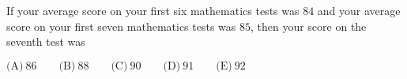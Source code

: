 

If your average score on your first six mathematics tests was $84$ and your average score on your first seven mathematics tests was $85$, then your score on the seventh test was

$\text{(A)}\ 86 \qquad \text{(B)}\ 88 \qquad \text{(C)}\ 90 \qquad \text{(D)}\ 91 \qquad \text{(E)}\ 92$
